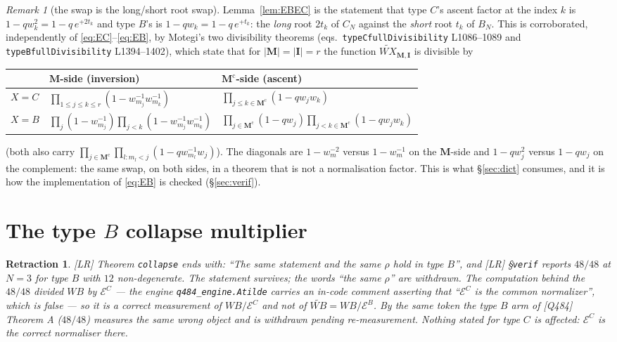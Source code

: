 \documentclass[11pt]{article}
\theoremstyle{plain}
\theoremstyle{definition}
\theoremstyle{remark}
\newtheorem{rem}[thm]{Remark}
\theoremstyle{plain}
\newtheorem{retr}{Retraction}
\newcommand{\bI}{\mathbf{I}}
\newcommand{\bM}{\mathbf{M}}
\begin{document}
\begin{rem}[the swap is the long/short root swap]\label{rem:rootswap}
Lemma~\ref{lem:EBEC} is the statement that type $C$'s ascent factor at the index
$k$ is $1-qw_k^2=1-q\,e^{+2t_k}$ and type $B$'s is $1-qw_k=1-q\,e^{+t_k}$:
the \emph{long} root $2t_k$ of $C_N$ against the \emph{short} root $t_k$ of
$B_N$.  This is corroborated, independently of \eqref{eq:EC}--\eqref{eq:EB}, by
Motegi's two divisibility theorems (eqs.\ \texttt{typeCfullDivisibility}
L1086--1089 and \texttt{typeBfullDivisibility} L1394--1402), which state that
for $|\bM|=|\bI|=r$ the function $\widetilde{WX}_{\bM,\bI}$ is divisible by
\begin{center}
\begin{tabular}{@{}lll@{}}
\toprule
 & $\bM$-side (inversion) & $\bM^{\mathrm{c}}$-side (ascent) \\
\midrule
$X=C$ & $\prod_{1\le j\le k\le r}(1-w_{m_j}^{-1}w_{m_k}^{-1})$
      & $\prod_{j\le k\in\bM^{\mathrm{c}}}(1-qw_jw_k)$ \\
$X=B$ & $\prod_{j}(1-w_{m_j}^{-1})\prod_{j<k}(1-w_{m_j}^{-1}w_{m_k}^{-1})$
      & $\prod_{j\in\bM^{\mathrm{c}}}(1-qw_j)\prod_{j<k\in\bM^{\mathrm{c}}}(1-qw_jw_k)$ \\
\bottomrule
\end{tabular}
\end{center}
(both also carry $\prod_{j\in\bM^{\mathrm{c}}}\prod_{l:m_l<j}(1-qw_{m_l}^{-1}w_j)$).
The diagonals are $1-w_m^{-2}$ versus $1-w_m^{-1}$ on the $\bM$-side and
$1-qw_j^2$ versus $1-qw_j$ on the complement: the same swap, on both sides, in a
theorem that is not a normalisation factor.  This is what \S\ref{sec:dict}
consumes, and it is how the implementation of \eqref{eq:EB} is checked
(\S\ref{sec:verif}).
\end{rem}

\section{The type \texorpdfstring{$B$}{B} collapse multiplier}
\label{sec:rhoB}

\begin{retr}\label{retr:typeB}
[LR] Theorem \texttt{collapse} ends with: ``\emph{The same statement and the
same $\rho$ hold in type $B$}'', and [LR] \S\texttt{verif} reports
$48/48$ at $N=3$ for type $B$ with $12$ non-degenerate.  The \emph{statement}
survives; the words ``the same $\rho$'' are withdrawn.  The computation behind
the $48/48$ divided $WB$ by $\mathcal{E}^C$ --- the engine
\texttt{q484\_engine.Atilde} carries an in-code comment asserting that
``$\mathcal{E}^C$ is the common normalizer'', which is false --- so it is a
correct measurement of $WB/\mathcal{E}^C$ and not of
$\widetilde{WB}=WB/\mathcal{E}^B$.  By the same token the type $B$ arm of
[Q484] Theorem A ($48/48$) measures the same wrong object and is withdrawn
pending re-measurement.  Nothing stated for type $C$ is affected:
$\mathcal{E}^C$ is the correct normaliser there.
\end{retr}
\end{document}

